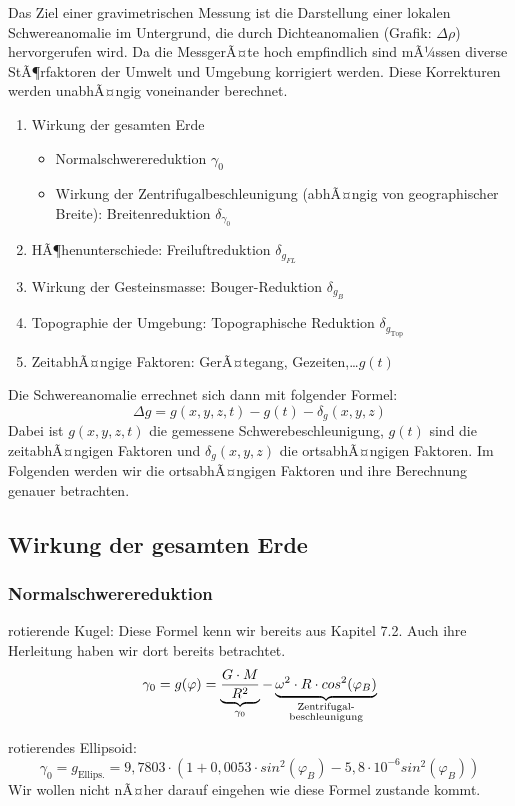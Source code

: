 Das Ziel einer gravimetrischen Messung ist die Darstellung einer lokalen Schwereanomalie im Untergrund, die durch Dichteanomalien (Grafik: $\Delta \rho$) hervorgerufen wird. Da die MessgerÃ¤te hoch empfindlich sind mÃ¼ssen diverse StÃ¶rfaktoren der Umwelt und Umgebung korrigiert werden. Diese Korrekturen werden unabhÃ¤ngig voneinander berechnet.  
\begin{enumerate}
	\item Wirkung der gesamten Erde \begin{itemize}
		\item Normalschwerereduktion $\gamma_0$
		\item Wirkung der Zentrifugalbeschleunigung (abhÃ¤ngig von geographischer Breite): Breitenreduktion $\delta_{\gamma_0}$
		\end{itemize}
	\item HÃ¶henunterschiede: Freiluftreduktion $\delta_{g_{FL}}$
	\item Wirkung der Gesteinsmasse: Bouger-Reduktion $\delta_{g_B}$
	\item Topographie der Umgebung: Topographische Reduktion $\delta_{g_{\text{Top}}}$
	\item ZeitabhÃ¤ngige Faktoren: GerÃ¤tegang, Gezeiten,\dots \space$g(t)$
\end{enumerate} 
Die Schwereanomalie errechnet sich dann mit folgender Formel: 
\begin{equation*}
	\Delta g = g(x,y,z,t) - g(t) - \delta_g (x,y,z)
\end{equation*}
Dabei ist $g(x,y,z,t)$ die gemessene Schwerebeschleunigung, $g(t)$ sind die zeitabhÃ¤ngigen Faktoren und $\delta_g (x,y,z)$ die ortsabhÃ¤ngigen Faktoren. 
Im Folgenden werden wir die ortsabhÃ¤ngigen Faktoren und ihre Berechnung genauer betrachten. 

\subsection{Wirkung der gesamten Erde}
\subsubsection{Normalschwerereduktion}

\begin{description} 
	\item rotierende Kugel: Diese Formel kenn wir bereits aus Kapitel 7.2. Auch ihre Herleitung haben wir dort bereits betrachtet. \begin{equation*}
		\gamma_0 = g(\varphi) = \ub{\frac{G \cdot M}{R^2}}{\gamma_0} - \ub{\omega^2 \cdot R \cdot cos^2(\varphi_B)}{\substack{\text{Zentrifugal-} \\ \text{beschleunigung}}}
	\end{equation*}
	
	\item rotierendes Ellipsoid: \begin{equation*}
		\gamma_0 = g_{\text{Ellips.}} = 9,7803 \cdot (1 + 0,0053 \cdot sin^2(\varphi_B) - 5,8 \cdot 10^{-6} sin^2(\varphi_B))
	\end{equation*} Wir wollen nicht nÃ¤her darauf eingehen wie diese Formel zustande kommt.
\end{description}

